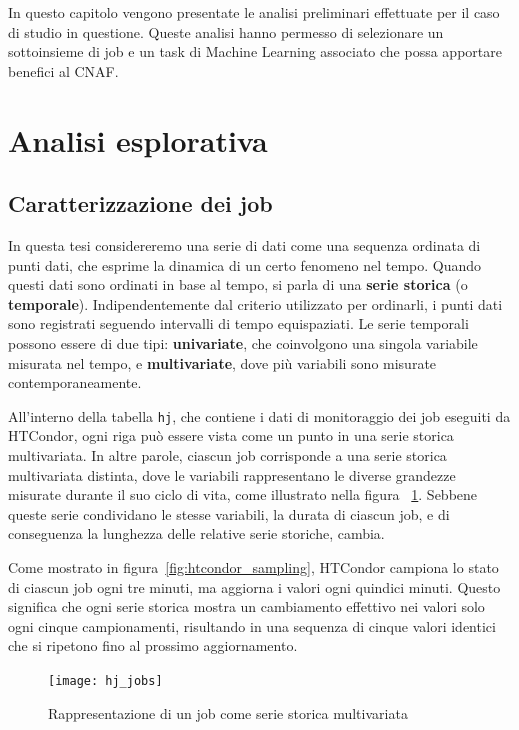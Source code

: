 \label{chap:analisi}

In questo capitolo vengono presentate le analisi preliminari effettuate per il
caso di studio in questione. Queste analisi hanno permesso di selezionare un
sottoinsieme di job e un task di Machine Learning associato che possa
apportare benefici al CNAF.

\section{Analisi esplorativa}

\subsection{Caratterizzazione dei job}
\label{sec:job_analysis}
In questa tesi considereremo una serie di dati come una sequenza ordinata di
punti dati, che esprime la dinamica di un certo fenomeno nel tempo. Quando
questi dati sono ordinati in base al tempo, si parla di una \textbf{serie
storica} (o \textbf{temporale}).
Indipendentemente dal criterio utilizzato per ordinarli, i punti dati sono
registrati seguendo intervalli di tempo equispaziati. Le serie temporali
possono essere di due tipi: \textbf{univariate}, che coinvolgono una
singola variabile misurata nel tempo, e \textbf{multivariate}, dove più
variabili sono misurate contemporaneamente.

All'interno della tabella \texttt{hj}, che contiene i dati di monitoraggio dei
job eseguiti da HTCondor, ogni riga può essere vista come un punto in una
serie storica multivariata. In altre parole, ciascun job corrisponde a una
serie storica multivariata distinta, dove le variabili rappresentano le
diverse grandezze misurate durante il suo ciclo di vita, come illustrato nella
figura~ \ref{fig:job_time_series}. Sebbene queste serie condividano le stesse
variabili, la durata di ciascun job, e di conseguenza la lunghezza delle
relative serie storiche, cambia.

Come mostrato in figura~\ref{fig:htcondor_sampling}, HTCondor campiona lo
stato di ciascun job ogni tre minuti, ma aggiorna i valori ogni quindici
minuti. Questo significa che ogni serie storica mostra un cambiamento
effettivo nei valori solo ogni cinque campionamenti, risultando in una
sequenza di cinque valori identici che si ripetono fino al prossimo
aggiornamento.

\begin{figure}[p]
    \centering 
    \texttt{[image: hj\_jobs]}
    \caption{\small Rappresentazione di un job come serie storica multivariata}
    \label{fig:job_time_series}
\end{figure}

